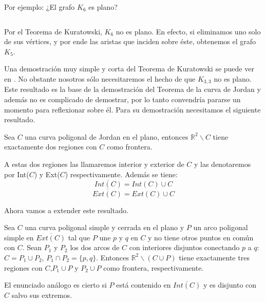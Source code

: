 Por ejemplo: ¿El grafo $K_6$ es plano?
\[\]
\[\]
	
	Por el Teorema de Kuratowski, $K_{6}$ no es plano. En efecto, si eliminamos uno solo de sus vértices, y por ende las aristas que inciden sobre éste, obtenemos el grafo $K_5$.
	
	Una demostración muy simple y corta del Teorema de Kuratowski se puede ver en \cite{Kuratowski}. No obstante nosotros sólo necesitaremos el hecho de que $K_{3,3}$ no es plano.
	Este resultado es la base de la demostración del Teorema de la curva de Jordan y además no es complicado de demostrar, por lo tanto convendría pararse un momento para reflexionar sobre él. Para su demostración necesitamos el siguiente resultado.
	
\begin{lemma}
	Sea $C$ una curva poligonal de Jordan en el plano, entonces $\mathbb{R}^2 \backslash C$ tiene exactamente dos regiones con $C$ como frontera.
\end{lemma}

	A estas dos regiones las llamaremos interior y exterior de $C$ y las denotaremos por Int($C$) y Ext($C$) respectivamente. Además se tiene:
\[
\overline{Int(C)} = Int(C) \cup C
\]
\[
\overline{Ext(C)} = Ext(C) \cup C
\]

Ahora vamos a extender este resultado.

\begin{lemma}\label{lema24}
	Sea $C$ una curva poligonal simple y cerrada en el plano y $P$ un arco poligonal simple en $\overline{Ext(C)}$ tal que $P$ une $p$ y $q$ en $C$ y no tiene otros puntos en común con $C$. Sean $P_1$ y $P_2$ los dos arcos de $C$ con interiores disjuntos conectando $p$ a $q$: $C=P_1\cup P_2$, $P_1\cap P_2=\{p,q\}$. Entonces $\mathbb{R}^2 \backslash (C \cup P)$ tiene exactamente tres regiones con $C$,$P_{1} \cup P$ y $P_{2} \cup P$ como frontera, respectivamente.
	
El enunciado análogo es cierto si $P$ está contenido en  $\overline{Int(C)}$ y es disjunto con $C$ salvo sus extremos.
\end{lemma}

